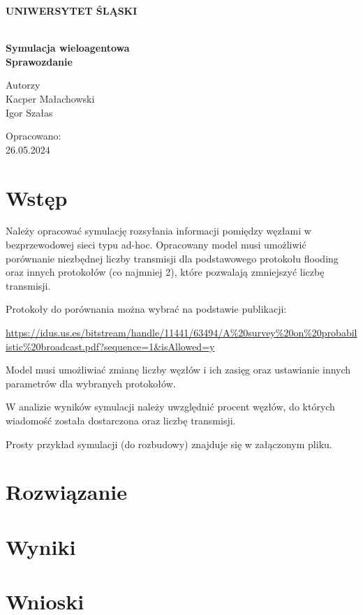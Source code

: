 \documentclass[12pt,oneside,a4paper]{book} %
\theoremstyle{break}
\begin{document}
\thispagestyle{empty}
\begin{center}
  \Large
  \bf{UNIWERSYTET ŚLĄSKI}\\
  \bf{}\\[25mm]
  \large

  \bf{Symulacja wieloagentowa}\\[35mm]

  Sprawozdanie\\[25mm]
\end{center}
\begin{flushright}
  \large
  Autorzy\\
  Kacper Małachowski\\
  Igor Szałas\\[25mm]
\end{flushright}
\begin{center}
  Opracowano:\\
  26.05.2024
\end{center}

\chapter*{Wstęp}

Należy opracować symulację rozsyłania informacji pomiędzy węzłami w bezprzewodowej sieci typu ad-hoc. Opracowany model musi umożliwić porównanie niezbędnej liczby transmisji dla podstawowego protokołu flooding oraz innych protokołów (co najmniej 2), które pozwalają zmniejszyć liczbę transmisji.  

Protokoły do porównania można wybrać na podstawie publikacji:  

\url{https://idus.us.es/bitstream/handle/11441/63494/A%20survey%20on%20probabilistic%20broadcast.pdf?sequence=1&isAllowed=y}

 Model musi umożliwiać zmianę liczby węzłów i ich zasięg oraz ustawianie innych parametrów dla wybranych protokołów. 

W analizie wyników symulacji należy uwzględnić  procent węzłów, do których wiadomość została dostarczona  oraz liczbę transmisji. 

Prosty przykład symulacji (do rozbudowy) znajduje się w załączonym pliku. 


\chapter*{Rozwiązanie}



\chapter*{Wyniki}


\chapter*{Wnioski}
\end{document}
